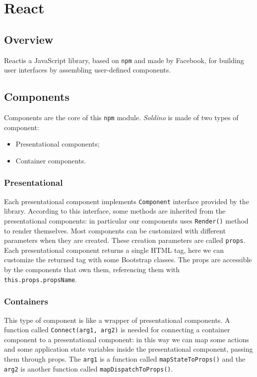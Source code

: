 \section{React} 

\subsection{Overview}
React\glosp is a JavaScript library, based on \texttt{npm} and made by Facebook, for building user interfaces by assembling user-defined components.
\subsection{Components}
Components are the core of this \texttt{npm} module. \textit{Soldino} is made of two types of component:
\begin{itemize}
	\item Presentational components;
	\item Container components.
\end{itemize}
\subsubsection{Presentational}
Each presentational component implements \texttt{Component} interface provided by the library. According to this interface, some methods are inherited from the presentational components: in particular our components uses \texttt{Render()} method to render themselves.
Most components can be customized with different parameters when they are created. These creation parameters are called \texttt{props}. Each presentational component returns a single HTML tag, here we can customize the returned tag with some Bootstrap classes. The props are accessible by the components that own them, referencing them with \texttt{this.props.propsName}.

\subsubsection{Containers} 
This type of component is like a wrapper of presentational components. A function called \texttt{Connect(arg1, arg2)} is needed for connecting a container component to a presentational component: in this way we can map some actions and some application state variables inside the presentational component, passing them through props. The \texttt{arg1} is a function called \texttt{mapStateToProps()} and the \texttt{arg2} is another function called \texttt{mapDispatchToProps()}.
